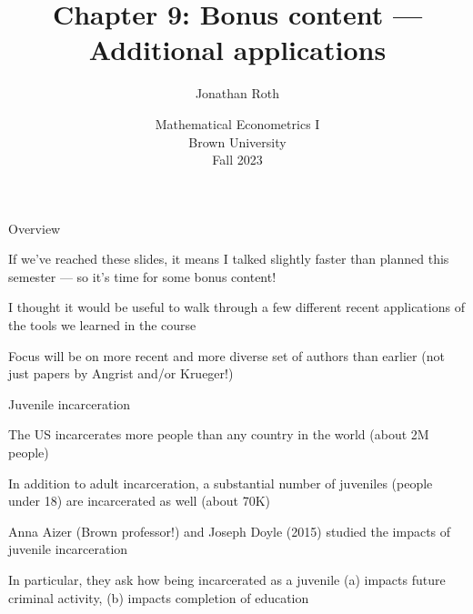\documentclass[11pt,english,handout]{beamer}
\newenvironment{wideitemize}{\itemize\addtolength{\itemsep}{10pt}}{\enditemize}
\begin{document}
	
	\begin{frame}[noframenumbering]{}
		\vspace{0.5cm}
		\title[]{Chapter 9: Bonus content --- Additional applications}
		\author{Jonathan Roth}
		\date{Mathematical Econometrics I \\ Brown University\\Fall 2023} 
		\titlepage {\small{}\ }\thispagestyle{empty} \vspace{-30pt}
		
	\end{frame}


	\begin{frame}{Overview}
		\begin{wideitemize}
			\item
			If we've reached these slides, it means I talked slightly faster than planned this semester --- so it's time for some bonus content!
			
			\item
			I thought it would be useful to walk through a few different recent applications of the tools we learned in the course
			
			\item
			Focus will be on more recent and more diverse set of authors than earlier (not just papers by Angrist and/or Krueger!)
		\end{wideitemize}
	\end{frame}	


	\begin{frame}{Juvenile incarceration}
		\begin{wideitemize}
			\item
			The US incarcerates more people than any country in the world (about 2M people)
			
			\item
			In addition to adult incarceration, a substantial number of juveniles (people under 18) are incarcerated as well (about 70K)
			
			\item
			Anna Aizer (Brown professor!) and Joseph Doyle (2015) studied the impacts of juvenile incarceration
			
			\item
			In particular, they ask how being incarcerated as a juvenile (a) impacts future criminal activity, (b) impacts completion of education
			
		\end{wideitemize}
	\end{frame}
\end{document}

